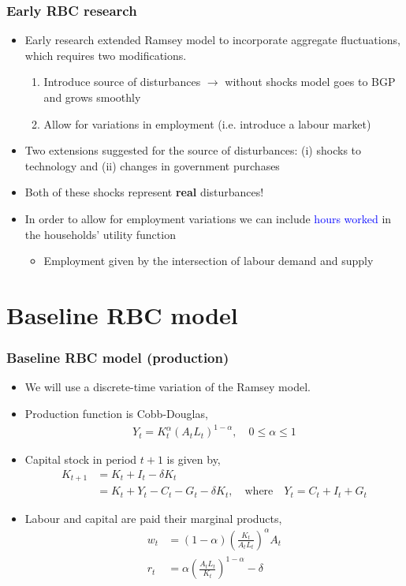 \documentclass[10pt, handout]{beamer} %
\begin{document}
\begin{frame}
\frametitle{Early RBC research}
\begin{itemize}[<+->]
\item Early research extended Ramsey model to incorporate aggregate fluctuations, which requires two modifications.
\begin{enumerate}
\item Introduce source of disturbances $\rightarrow$ without shocks model goes to BGP and grows smoothly
\item Allow for variations in employment (i.e. introduce a labour market)
\end{enumerate}
\vspace{2mm}
\item Two extensions suggested for the source of disturbances: (i) shocks to technology and (ii) changes in government purchases
\item Both of these shocks represent \textbf{real} disturbances!
\vspace{2mm}
\item In order to allow for employment variations we can include \textcolor{blue}{hours worked} in the households' utility function
\begin{itemize}
  \item Employment given by the intersection of labour demand and supply
\end{itemize}
\end{itemize}
\end{frame}


\section{Baseline RBC model}


\begin{frame}
\frametitle{Baseline RBC model (production)}
\begin{itemize}[<+->]
\item We will use a discrete-time variation of the Ramsey model.
\item Production function is Cobb-Douglas,
\begin{align*}
Y_{t} = K_{t}^{\alpha}(A_{t}L_{t})^{1-\alpha}, \quad 0 \leq \alpha \leq 1
\end{align*}
\item Capital stock in period $t+1$ is given by,
\begin{align*}
K_{t+1} &= K_{t} + I_{t} - {\delta}K_{t} \\
&= K_{t} + Y_{t} - C_{t} - G_{t} - \delta{K_{t}}, \quad \text{where} \quad Y_{t} = C_{t} + I_{t} + G_{t}
\end{align*}
\item Labour and capital are paid their marginal products,
\begin{align*}
w_{t} &= (1 - \alpha)\left(\frac{K_{t}}{A_{t}L_{t}}\right)^{\alpha}A_{t} \\
r_{t} &= \alpha\left(\frac{A_{t}L_{t}}{K_{t}}\right)^{1 - \alpha} - \delta
\end{align*}
\end{itemize}
\end{frame}
\end{document}
